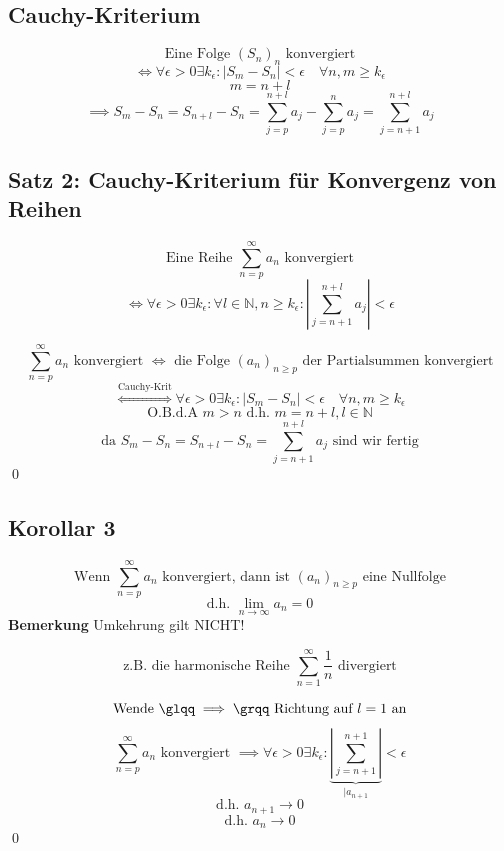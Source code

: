 \documentclass[fleqn]{scrbook}
\newcommand{\mqq}[1]{\text{\glqq} #1\text{\grqq}}
\renewenvironment{proof}{{\bfseries Beweis }}{\qed}
\begin{document}
\subsection{Cauchy-Kriterium}

\[\text{Eine Folge } (S_n)_n \text{ konvergiert} \]
\[\Longleftrightarrow \forall \epsilon > 0 \exists k_\epsilon : |S_m -S_n|<\epsilon \quad \forall n,m \geq k_\epsilon\] 
\[m=n+l\]
\[\implies S_m - S_n = S_{n+l} - S_n = \sum_{j=p}^{n+l} a_j -\sum_{j=p}^n a_j = \sum_{j=n+1}^{n+l} a_j\]

\subsection{Satz 2: Cauchy-Kriterium für Konvergenz von Reihen}

\[\text{Eine Reihe } \sum_{n=p}^\infty a_n \text{ konvergiert} \]
\[\Longleftrightarrow \forall \epsilon > 0 \exists k_\epsilon : \forall l \in \mathbb{N}, n \geq k_\epsilon : \left|\sum_{j=n+1}^{n+l} a_j\right|<\epsilon\]

\begin{proof}
  \[\sum_{n=p}^\infty a_n \text{ konvergiert } \Longleftrightarrow \text{ die Folge } (a_n)_{n\geq p} \text{ der Partialsummen konvergiert}\]
  \[\stackrel{\text{Cauchy-Krit}}{\Longleftrightarrow} \forall \epsilon > 0 \exists k_\epsilon : | S_m -S_n | < \epsilon \quad \forall n,m \geq k_\epsilon\]
  \[\text{O.B.d.A } m>n \text{ d.h. } m=n+l,l\in \mathbb{N}\]
  \[\text{da } S_m-S_n = S_{n+l}- S_n = \sum_{j=n+1}^{n+l} a_j \text{ sind wir fertig}\]
\end{proof}

\subsection{Korollar 3}

\[\text{Wenn } \sum_{n=p}^\infty a_n \text{ konvergiert, dann ist } (a_n)_{n \geq p} \text{ eine Nullfolge} \]
\[\text{d.h. } \lim_{n\to \infty} a_n = 0\]
\textbf{Bemerkung}
Umkehrung gilt NICHT!

\[\text{z.B. die harmonische Reihe } \sum_{n=1}^\infty \frac{1}{n} \text{ divergiert}\]

\begin{proof}
  \[\text{Wende } \mqq{\implies} \text{ Richtung auf } l=1 \text{ an}\]
  \[\sum_{n=p}^\infty a_n \text{ konvergiert } \implies \forall \epsilon > 0 \exists k_\epsilon : \underbrace{\left| \sum_{j=n+1}^{n+1} \right|}_{|a_{n+1}}<\epsilon\]
  \[\text{d.h. } a_{n+1} \to 0\]
  \[\text{d.h. } a_{n} \to 0\]
\end{proof}
\end{document}
